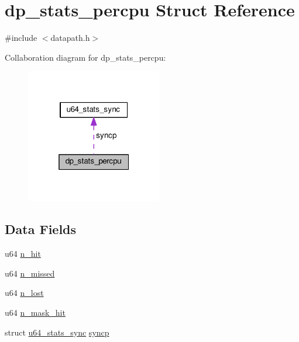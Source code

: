 \hypertarget{structdp__stats__percpu}{}\section{dp\+\_\+stats\+\_\+percpu Struct Reference}
\label{structdp__stats__percpu}


{\ttfamily \#include $<$datapath.\+h$>$}



Collaboration diagram for dp\+\_\+stats\+\_\+percpu\+:
\nopagebreak
\begin{figure}[H]
\begin{center}
\leavevmode
\includegraphics[width=169pt]{structdp__stats__percpu__coll__graph}
\end{center}
\end{figure}
\subsection*{Data Fields}
\begin{DoxyCompactItemize}
\item 
u64 \hyperlink{structdp__stats__percpu_add53281b86504a50626cce7fac173d5b}{n\+\_\+hit}
\item 
u64 \hyperlink{structdp__stats__percpu_ab919c22c9548a3dcd42632fb84634e26}{n\+\_\+missed}
\item 
u64 \hyperlink{structdp__stats__percpu_abecbd535feefeb9ff1721ca6e517c310}{n\+\_\+lost}
\item 
u64 \hyperlink{structdp__stats__percpu_acbf57615b1fb66464f9e67efb32bd038}{n\+\_\+mask\+\_\+hit}
\item 
struct \hyperlink{structu64__stats__sync}{u64\+\_\+stats\+\_\+sync} \hyperlink{structdp__stats__percpu_ad67971f59f6db5432848db23d185dc2f}{syncp}
\end{DoxyCompactItemize}


